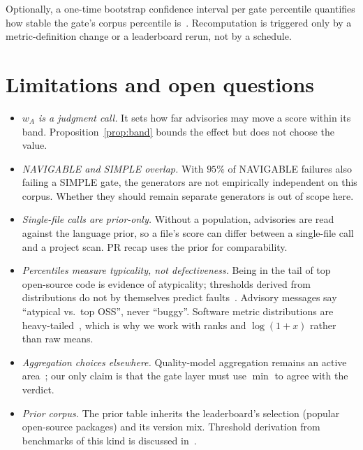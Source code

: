 \documentclass[11pt]{article}
\theoremstyle{remark}
\newcommand{\wA}{w_A}
\begin{document}
Optionally, a one-time bootstrap confidence interval per gate percentile
quantifies how stable the gate's corpus percentile is~\cite{foucault2014}.
Recomputation is triggered only by a metric-definition change or a leaderboard
rerun, not by a schedule.

\section{Limitations and open questions}

\begin{itemize}
  \item \emph{$\wA$ is a judgment call.} It sets how far advisories may move a
        score within its band. Proposition~\ref{prop:band} bounds the effect but
        does not choose the value.
  \item \emph{NAVIGABLE and SIMPLE overlap.} With $95\%$ of NAVIGABLE failures
        also failing a SIMPLE gate, the generators are not empirically
        independent on this corpus. Whether they should remain separate
        generators is out of scope here.
  \item \emph{Single-file calls are prior-only.} Without a population,
        advisories are read against the language prior, so a file's score can
        differ between a single-file call and a project scan. PR recap uses the
        prior for comparability.
  \item \emph{Percentiles measure typicality, not defectiveness.} Being in the
        tail of top open-source code is evidence of atypicality; thresholds
        derived from distributions do not by themselves predict
        faults~\cite{lavazza2016,elemam2001}. Advisory messages say ``atypical
        vs.\ top OSS'', never ``buggy''. Software metric distributions are
        heavy-tailed~\cite{concas2007,ferreira2012}, which is why we work with
        ranks and $\log(1 + x)$ rather than raw means.
  \item \emph{Aggregation choices elsewhere.} Quality-model aggregation remains
        an active area~\cite{mordal2013,wagner2015}; our only claim is that the
        gate layer must use $\min$ to agree with the verdict.
  \item \emph{Prior corpus.} The prior table inherits the leaderboard's
        selection (popular open-source packages) and its version mix.
        Threshold derivation from benchmarks of this kind is discussed
        in~\cite{alves2010,ernst2018,mori2018}.
\end{itemize}
\end{document}

